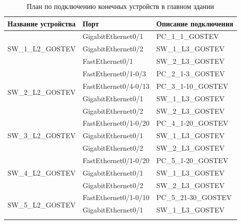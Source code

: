 \documentclass[14pt, a4paper]{extarticle}
\numberwithin{equation}{section}
\begin{document}
\begin{table}[H]
\small
\centering
\caption{План по подключению конечных устройств в главном здании}
\label{table:mainDepConnectionPlan}
\begin{tabular}{|l|l|l|}
\hline
\textbf{Название устройства}        & \textbf{Порт}            & \textbf{Описание подключения} \\ \hline
\multirow{3}{*}{SW\_1\_L2\_GOSTEV}  & GigabitEthernet0/1       & PC\_1\_1\_GOSTEV              \\ \cline{2-3} 
                                    & GigabitEthernet0/2       & SW\_1\_L3\_GOSTEV             \\ \cline{2-3} 
                                    & FastEthernet0/1          & SW\_2\_L3\_GOSTEV             \\ \hline
\multirow{4}{*}{SW\_2\_L2\_GOSTEV}  & FastEthernet0/1-0/3      & PC\_2\_1-3\_GOSTEV            \\ \cline{2-3} 
                                    & FastEthernet0/4-0/13     & PC\_3\_1-10\_GOSTEV           \\ \cline{2-3} 
                                    & GigabitEthernet0/1       & SW\_1\_L3\_GOSTEV             \\ \cline{2-3} 
                                    & GigabitEthernet0/2       & SW\_2\_L3\_GOSTEV             \\ \hline
\multirow{3}{*}{SW\_3\_L2\_GOSTEV}  & FastEthernet0/1-0/20     & PC\_4\_1-20\_GOSTEV           \\ \cline{2-3} 
                                    & GigabitEthernet0/1       & SW\_1\_L3\_GOSTEV             \\ \cline{2-3} 
                                    & GigabitEthernet0/2       & SW\_2\_L3\_GOSTEV             \\ \hline
\multirow{3}{*}{SW\_4\_L2\_GOSTEV}  & FastEthernet0/1-0/20     & PC\_5\_1-20\_GOSTEV           \\ \cline{2-3} 
                                    & GigabitEthernet0/1       & SW\_1\_L3\_GOSTEV             \\ \cline{2-3} 
                                    & GigabitEthernet0/2       & SW\_2\_L3\_GOSTEV             \\ \hline
\multirow{3}{*}{SW\_5\_L2\_GOSTEV}  & FastEthernet0/1-0/10     & PC\_5\_21-30\_GOSTEV          \\ \cline{2-3} 
                                    & GigabitEthernet0/1       & SW\_1\_L3\_GOSTEV             \\ \cline{2-3} 

\end{tabular}
\end{table}
\end{document}
